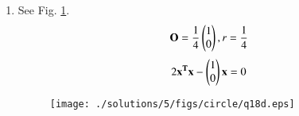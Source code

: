 \begin{enumerate}
\begin{comment}
	\begin{figure}[!ht]
	\centering
	\texttt{[image: ./solutions/5/figs/circle/q18abc.eps]}
	\caption{Circle of Q.4.2.5}
	\label{fig:4.2.5_qoeb}	
	\end{figure}
\end{comment}
\begin{comment}
	\begin{figure}[!ht]
	\centering
	\texttt{[image: ./solutions/5/figs/circle/q18abc.eps]}
	\caption{Circle of Q.4.2.5}
	\label{fig:4.2.5_qoec}	
	\end{figure}
\end{comment}
\item See Fig. \ref{fig:4.2.5_qoed}.
\begin{align}
\mathbf{O} = \frac{1}{4}\begin{pmatrix}1\\0\end{pmatrix}, r = \frac{1}{4}
\end{align}
\begin{align} 
2\mathbf{x^Tx} - \begin{pmatrix}1\\0\end{pmatrix}\mathbf{x} = 0
\end{align}
	\begin{figure}[!ht]
	\centering
	\texttt{[image: ./solutions/5/figs/circle/q18d.eps]}
	\caption{}
	\label{fig:4.2.5_qoed}	
	\end{figure}



\end{enumerate}
